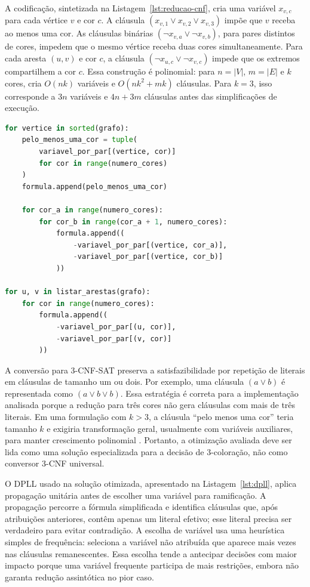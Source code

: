 A codificação, sintetizada na Listagem~\ref{lst:reducao-cnf}, cria uma variável $x_{v,c}$ para cada vértice $v$ e cor $c$. A cláusula $(x_{v,1}\vee x_{v,2}\vee x_{v,3})$ impõe que $v$ receba ao menos uma cor. As cláusulas binárias $(\neg x_{v,a}\vee \neg x_{v,b})$, para pares distintos de cores, impedem que o mesmo vértice receba duas cores simultaneamente. Para cada aresta $(u,v)$ e cor $c$, a cláusula $(\neg x_{u,c}\vee \neg x_{v,c})$ impede que os extremos compartilhem a cor $c$. Essa construção é polinomial: para $n=|V|$, $m=|E|$ e $k$ cores, cria $O(nk)$ variáveis e $O(nk^2+mk)$ cláusulas. Para $k=3$, isso corresponde a $3n$ variáveis e $4n+3m$ cláusulas antes das simplificações de execução.

\begin{lstlisting}[language=Python, caption={Geração das cláusulas CNF para coloração}, label={lst:reducao-cnf}]
for vertice in sorted(grafo):
    pelo_menos_uma_cor = tuple(
        variavel_por_par[(vertice, cor)]
        for cor in range(numero_cores)
    )
    formula.append(pelo_menos_uma_cor)

    for cor_a in range(numero_cores):
        for cor_b in range(cor_a + 1, numero_cores):
            formula.append((
                -variavel_por_par[(vertice, cor_a)],
                -variavel_por_par[(vertice, cor_b)]
            ))

for u, v in listar_arestas(grafo):
    for cor in range(numero_cores):
        formula.append((
            -variavel_por_par[(u, cor)],
            -variavel_por_par[(v, cor)]
        ))
\end{lstlisting}

A conversão para 3-CNF-SAT preserva a satisfazibilidade por repetição de literais em cláusulas de tamanho um ou dois. Por exemplo, uma cláusula $(a\vee b)$ é representada como $(a\vee b\vee b)$. Essa estratégia é correta para a implementação analisada porque a redução para três cores não gera cláusulas com mais de três literais. Em uma formulação com $k>3$, a cláusula ``pelo menos uma cor'' teria tamanho $k$ e exigiria transformação geral, usualmente com variáveis auxiliares, para manter crescimento polinomial \parencite{Silva2026PAA13}. Portanto, a otimização avaliada deve ser lida como uma solução especializada para a decisão de 3-coloração, não como conversor 3-CNF universal.

O DPLL usado na solução otimizada, apresentado na Listagem~\ref{lst:dpll}, aplica propagação unitária antes de escolher uma variável para ramificação. A propagação percorre a fórmula simplificada e identifica cláusulas que, após atribuições anteriores, contêm apenas um literal efetivo; esse literal precisa ser verdadeiro para evitar contradição. A escolha de variável usa uma heurística simples de frequência: seleciona a variável não atribuída que aparece mais vezes nas cláusulas remanescentes. Essa escolha tende a antecipar decisões com maior impacto porque uma variável frequente participa de mais restrições, embora não garanta redução assintótica no pior caso.

